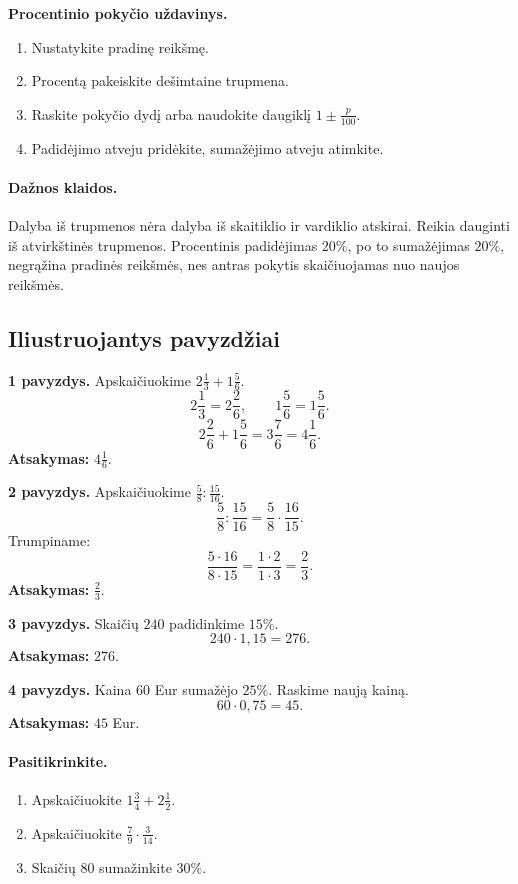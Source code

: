 \textbf{Procentinio pokyčio uždavinys.}
\begin{enumerate}[label=\arabic*.]
\item Nustatykite pradinę reikšmę.
\item Procentą pakeiskite dešimtaine trupmena.
\item Raskite pokyčio dydį arba naudokite daugiklį \(1\pm \frac{p}{100}\).
\item Padidėjimo atveju pridėkite, sumažėjimo atveju atimkite.
\end{enumerate}

\paragraph{Dažnos klaidos.}
Dalyba iš trupmenos nėra dalyba iš skaitiklio ir vardiklio atskirai. Reikia dauginti iš atvirkštinės trupmenos. Procentinis padidėjimas \(20\%\), po to sumažėjimas \(20\%\), negrąžina pradinės reikšmės, nes antras pokytis skaičiuojamas nuo naujos reikšmės.

\subsection{Iliustruojantys pavyzdžiai}
\textbf{1 pavyzdys.} Apskaičiuokime \(2\frac{1}{3}+1\frac{5}{6}\).
\[
2\frac{1}{3}=2\frac{2}{6},\qquad 1\frac{5}{6}=1\frac{5}{6}.
\]
\[
2\frac{2}{6}+1\frac{5}{6}=3\frac{7}{6}=4\frac{1}{6}.
\]
\textbf{Atsakymas:} \(4\frac{1}{6}\).

\textbf{2 pavyzdys.} Apskaičiuokime \(\frac{5}{8}:\frac{15}{16}\).
\[
\frac{5}{8}:\frac{15}{16}=\frac{5}{8}\cdot \frac{16}{15}.
\]
Trumpiname:
\[
\frac{5\cdot 16}{8\cdot 15}=\frac{1\cdot 2}{1\cdot 3}=\frac{2}{3}.
\]
\textbf{Atsakymas:} \(\frac{2}{3}\).

\textbf{3 pavyzdys.} Skaičių \(240\) padidinkime \(15\%\).
\[
240\cdot 1,15=276.
\]
\textbf{Atsakymas:} \(276\).

\textbf{4 pavyzdys.} Kaina \(60\) Eur sumažėjo \(25\%\). Raskime naują kainą.
\[
60\cdot 0,75=45.
\]
\textbf{Atsakymas:} \(45\) Eur.

\paragraph{Pasitikrinkite.}
\begin{enumerate}[label=\arabic*.]
\item Apskaičiuokite \(1\frac{3}{4}+2\frac{1}{2}\).
\item Apskaičiuokite \(\frac{7}{9}\cdot \frac{3}{14}\).
\item Skaičių \(80\) sumažinkite \(30\%\).
\end{enumerate}

